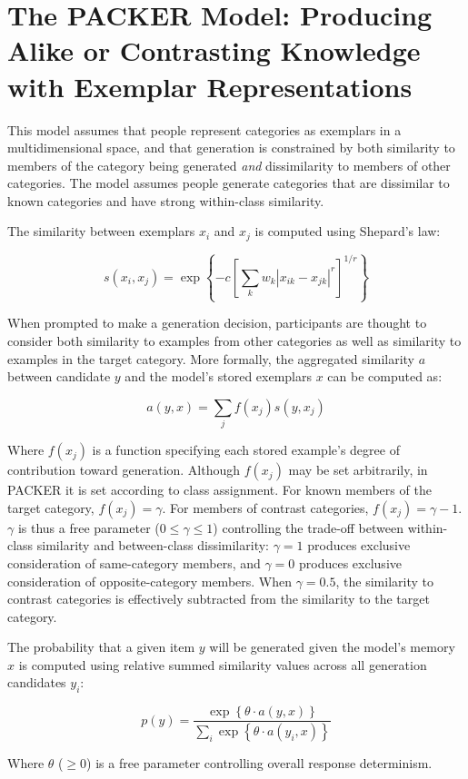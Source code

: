 \documentclass[12pt]{article}
\begin{document}
\section{The PACKER Model: Producing Alike or Contrasting Knowledge with Exemplar Representations}


This model assumes that people represent categories as exemplars in a multidimensional space, and that generation is constrained by both similarity to members of the category being generated \textit{and} dissimilarity to members of other categories. The model assumes people generate categories that are dissimilar to known categories and have strong within-class similarity.

The similarity between exemplars $x_i$ and $x_j$ is computed using Shepard's law:

\begin{equation}
s\left(x_i,x_j\right) = \exp \left\{ -c \left[\sum_{k}{ w_k \left| x_{ik} - x_{jk} \right|^r }\right]^{1/r} \right\}
\label{eq:similarity}
\end{equation}

When prompted to make a generation decision, participants are thought to consider both similarity to examples from other categories as well as similarity to examples in the target category. More formally, the aggregated similarity $a$ between candidate $y$ and the model's stored exemplars $x$ can be computed as:

\begin{equation}
  a(y, x) = \sum_j{f(x_j) s(y, x_j)}
\end{equation}

Where $f(x_j)$ is a function specifying each stored example's degree of contribution toward generation. Although $f(x_j)$ may be set arbitrarily, in PACKER it is set according to class assignment. For known members of the target category, $f(x_j) = \gamma$. For members of contrast categories, $f(x_j) = \gamma - 1$. $\gamma$ is thus a free parameter ($0 \leq \gamma \leq 1$) controlling the trade-off between within-class similarity and between-class dissimilarity: $\gamma = 1$ produces exclusive consideration of same-category members, and $\gamma = 0$ produces exclusive consideration of opposite-category members. When $\gamma = 0.5$, the similarity to contrast categories is effectively subtracted from the similarity to the target category.

The probability that a given item $y$ will be generated given the model's memory $x$ is computed using relative summed similarity values across all generation candidates $y_i$:

\begin{equation}
p(y) = \dfrac
{ \exp  \left \{ \theta \cdot a \left( y, x \right) \right \} } 
{ \sum_i{ \exp  \left \{ \theta \cdot a \left( y_i, x \right) \right\}  } }
\label{eq:packer-choice}
\end{equation}

Where $\theta$ ($\geq 0$) is a free parameter controlling overall response determinism.
\end{document}
